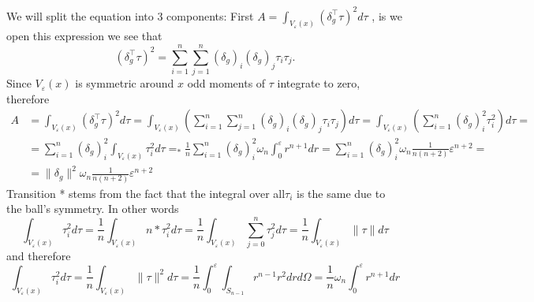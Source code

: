 We will split the equation into 3 components:
First \(A =  \int_{V_{\varepsilon}(x)}(\delta_g^\top\tau)^2d\tau\) ,  is we open this expression we see that
\[
(\delta_g^\top\tau)^2 = \sum_{i=1}^n \sum_{j=1}^n (\delta_g)_i (\delta_g)_j \tau_i \tau_j.
\]
Since \(V_{\varepsilon}(x)\) is symmetric around \(x\) odd moments of \(\tau\) integrate to zero, therefore
\begin{align*}
A &=  \int_{V_{\varepsilon}(x)}(\delta_g^\top\tau)^2d\tau = \int_{V_{\varepsilon}(x)}(\sum_{i=1}^n \sum_{j=1}^n (\delta_g)_i (\delta_g)_j \tau_i \tau_j) d\tau= \int_{V_{\varepsilon}(x)}(\sum_{i=1}^n  (\delta_g)_i^2 \tau_i^2 ) d\tau = \\
& = \sum_{i=1}^n  (\delta_g)_i^2\int_{V_{\varepsilon}(x)}\tau_i^2  d\tau =_* \frac{1}{n}\sum_{i=1}^n  (\delta_g)_i^2 \omega_n\int_{0}^\varepsilon r^{n+1}dr =  \sum_{i=1}^n  (\delta_g)_i^2 \omega_n \frac{1}{n(n+2)}\varepsilon^{n+2} =\\
& = \|\delta_g\|^2\omega_n \frac{1}{n(n+2)}\varepsilon^{n+2}
\end{align*}
Transition * stems from the fact that the integral over all\(\tau_i\) is the same due to the ball's symmetry. In other words 
\[\int_{V_{\varepsilon}(x)}\tau_i^2 d\tau = \frac{1}{n}\int_{V_{\varepsilon}(x)} n*\tau_i^2 d\tau  = \frac{1}{n}\int_{V_{\varepsilon}(x)} \sum_{j=0}^n\tau_j^2  d\tau = \frac{1}{n}\int_{V_{\varepsilon}(x)} \|\tau\| d\tau\]
and therefore
\[
\int_{V_{\varepsilon}(x)}\tau_i^2 d\tau = \frac{1}{n}\int_{V_{\varepsilon}(x)}\|\tau\|^2 d\tau = \frac{1}{n}\int_{0}^\varepsilon \int_{S_{n-1}}r^{n-1}r^2dr d\Omega = \frac{1}{n}\omega_n \int_{0}^\varepsilon r^{n+1}dr
\]

